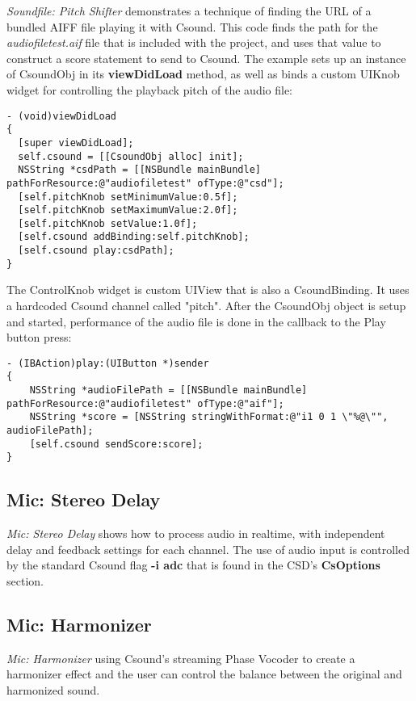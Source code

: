 \documentclass[11pt]{article}
\begin{document}
\emph{Soundfile: Pitch Shifter} demonstrates a technique of finding the URL of a bundled AIFF file playing it with Csound.  This code finds the path for the \emph{audiofiletest.aif} file that is included with the project, and uses that value to construct a score statement to send to Csound. The example sets up an instance of CsoundObj in its \textbf{viewDidLoad} method, as well as binds a custom UIKnob widget for controlling the playback pitch of the audio file:

\begin{lstlisting}[caption=CsoundObj setup code]
- (void)viewDidLoad
{
  [super viewDidLoad];
  self.csound = [[CsoundObj alloc] init];
  NSString *csdPath = [[NSBundle mainBundle] pathForResource:@"audiofiletest" ofType:@"csd"];
  [self.pitchKnob setMinimumValue:0.5f];
  [self.pitchKnob setMaximumValue:2.0f];
  [self.pitchKnob setValue:1.0f];
  [self.csound addBinding:self.pitchKnob];
  [self.csound play:csdPath];
}
\end{lstlisting}

The ControlKnob widget is custom UIView that is also a CsoundBinding.  It uses a hardcoded Csound channel called "pitch".  After the CsoundObj object is setup and started, performance of the audio file is done in the callback to the Play button press:

\begin{lstlisting}[caption=Play button callback code]
- (IBAction)play:(UIButton *)sender
{
    NSString *audioFilePath = [[NSBundle mainBundle] pathForResource:@"audiofiletest" ofType:@"aif"];
    NSString *score = [NSString stringWithFormat:@"i1 0 1 \"%@\"", audioFilePath];
    [self.csound sendScore:score];
}
\end{lstlisting}

\subsection{Mic: Stereo Delay}

\emph{Mic: Stereo Delay} shows how to process audio in realtime, with independent delay and feedback settings for each channel. The use of audio input is controlled by the standard Csound flag \textbf{-i adc} that is found in the CSD's \textbf{CsOptions} section.

\subsection{Mic: Harmonizer}

\emph{Mic: Harmonizer} using Csound's streaming Phase Vocoder to create a harmonizer effect and the user can control the balance between the original and harmonized sound.
\end{document}
